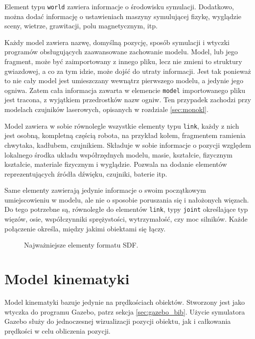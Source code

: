 	Element typu \texttt{world} zawiera informacje o środowisku symulacji.
	Dodatkowo, można dodać informację o ustawieniach maszyny symulującej fizykę, wyglądzie sceny, wietrze, grawitacji, polu magnetycznym, itp.

	Każdy model zawiera nazwę, domyślną pozycję, sposób symulacji i wtyczki programów obsługujących zaawansowane zachowanie modelu.
	Model, lub jego fragment, może być zaimportowany z innego pliku, lecz nie zmieni to struktury gwiazdowej, a co za tym idzie, może dojść do utraty informacji.
	Jest tak ponieważ to nie cały model jest umieszczany wewnątrz pierwszego modelu, a jedynie jego ogniwa. Zatem cała informacja zawarta w elemencie \texttt{model}
	importowanego pliku jest tracona, z wyjątkiem przedrostków nazw ogniw.
	Ten przypadek zachodzi przy modelach czujników laserowych, opisanych w rozdziale \ref{sec:monokl}.

	Model zawiera w sobie równolegle wszystkie elementy typu \texttt{link}, każdy z nich jest osobną, kompletną częścią robota, na przykład kołem, 
	fragmentem ramienia chwytaka, kadłubem, czujnikiem.
	Składuje w sobie informacje o pozycji względem lokalnego środka układu współrzędnych modelu, masie, kształcie, fizycznym kształcie, materiale fizycznym i wyglądzie.
	Pozwala na dodanie elementów reprezentujących źródła dźwięku, czujniki, baterie itp.

	Same elementy zawierają jedynie informacje o swoim początkowym umiejscowieniu w modelu, ale nie o sposobie poruszania się i nałożonych więzach.
	Do tego potrzebne są, równoległe do elementów \texttt{link}, typy \texttt{joint} określające typ więzów, osie, współczynniki sprężystości, wytrzymałość, czy moc silników.
	Każde połączenie określa, między jakimi obiektami się łączy.
	
	\begin{figure}[h]
	\caption{Najważniejsze elementy formatu SDF.}
	\label{fig:sdf_dir}
	\end{figure} 
	
\section{Model kinematyki}
	Model kinematyki bazuje jedynie na prędkościach obiektów.
	Stworzony jest jako wtyczka do programu Gazebo, patrz sekcja \ref{sec:gazebo_bib}.
	Użycie symulatora Gazebo służy do jednoczesnej wizualizacji pozycji obiektu, jak i całkowania prędkości w celu obliczenia pozycji.
	
